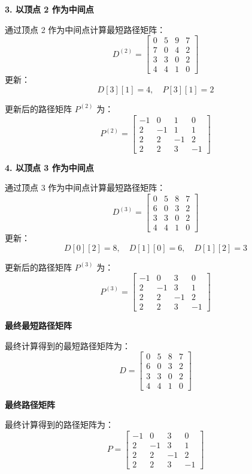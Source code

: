 \documentclass[lang=cn,newtx,10pt,scheme=chinese]{elegantbook}
\begin{document}
\textbf{3. 以顶点 2 作为中间点}

通过顶点 2 作为中间点计算最短路径矩阵：
\[
D^{(2)} =
\begin{bmatrix}
0 & 5 & 9 & 7 \\
7 & 0 & 4 & 2 \\
3 & 3 & 0 & 2 \\
4 & 4 & 1 & 0
\end{bmatrix}
\]
更新：
\[
D[3][1] = 4, \quad P[3][1] = 2
\]

更新后的路径矩阵 \( P^{(2)} \) 为：
\[
P^{(2)} =
\begin{bmatrix}
-1 & 0 & 1 & 0 \\
2 & -1 & 1 & 1 \\
2 & 2 & -1 & 2 \\
2 & 2 & 3 & -1
\end{bmatrix}
\]

\textbf{4. 以顶点 3 作为中间点}

通过顶点 3 作为中间点计算最短路径矩阵：
\[
D^{(3)} =
\begin{bmatrix}
0 & 5 & 8 & 7 \\
6 & 0 & 3 & 2 \\
3 & 3 & 0 & 2 \\
4 & 4 & 1 & 0
\end{bmatrix}
\]
更新：
\[
D[0][2] = 8, \quad D[1][0] = 6, \quad D[1][2] = 3
\]

更新后的路径矩阵 \( P^{(3)} \) 为：
\[
P^{(3)} =
\begin{bmatrix}
-1 & 0 & 3 & 0 \\
2 & -1 & 3 & 1 \\
2 & 2 & -1 & 2 \\
2 & 2 & 3 & -1
\end{bmatrix}
\]

\textbf{最终最短路径矩阵}

最终计算得到的最短路径矩阵为：
\[
D =
\begin{bmatrix}
0 & 5 & 8 & 7 \\
6 & 0 & 3 & 2 \\
3 & 3 & 0 & 2 \\
4 & 4 & 1 & 0
\end{bmatrix}
\]

\textbf{最终路径矩阵}

最终计算得到的路径矩阵为：
\[
P =
\begin{bmatrix}
-1 & 0 & 3 & 0 \\
2 & -1 & 3 & 1 \\
2 & 2 & -1 & 2 \\
2 & 2 & 3 & -1
\end{bmatrix}
\]
\end{document}
